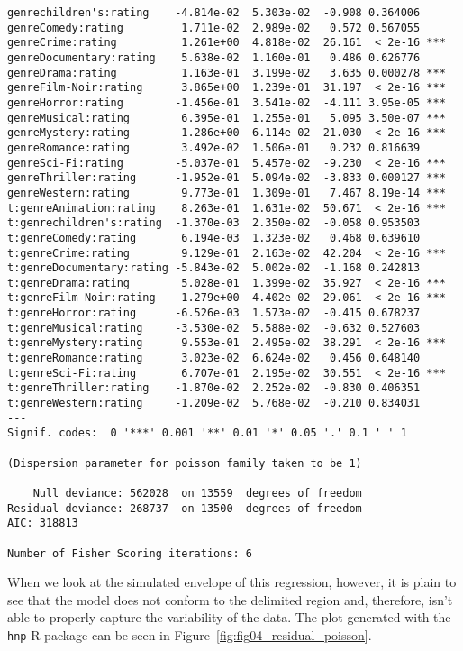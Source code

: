 \begin{verbatim}
genrechildren's:rating    -4.814e-02  5.303e-02  -0.908 0.364006
genreComedy:rating         1.711e-02  2.989e-02   0.572 0.567055
genreCrime:rating          1.261e+00  4.818e-02  26.161  < 2e-16 ***
genreDocumentary:rating    5.638e-02  1.160e-01   0.486 0.626776
genreDrama:rating          1.163e-01  3.199e-02   3.635 0.000278 ***
genreFilm-Noir:rating      3.865e+00  1.239e-01  31.197  < 2e-16 ***
genreHorror:rating        -1.456e-01  3.541e-02  -4.111 3.95e-05 ***
genreMusical:rating        6.395e-01  1.255e-01   5.095 3.50e-07 ***
genreMystery:rating        1.286e+00  6.114e-02  21.030  < 2e-16 ***
genreRomance:rating        3.492e-02  1.506e-01   0.232 0.816639
genreSci-Fi:rating        -5.037e-01  5.457e-02  -9.230  < 2e-16 ***
genreThriller:rating      -1.952e-01  5.094e-02  -3.833 0.000127 ***
genreWestern:rating        9.773e-01  1.309e-01   7.467 8.19e-14 ***
t:genreAnimation:rating    8.263e-01  1.631e-02  50.671  < 2e-16 ***
t:genrechildren's:rating  -1.370e-03  2.350e-02  -0.058 0.953503
t:genreComedy:rating       6.194e-03  1.323e-02   0.468 0.639610
t:genreCrime:rating        9.129e-01  2.163e-02  42.204  < 2e-16 ***
t:genreDocumentary:rating -5.843e-02  5.002e-02  -1.168 0.242813
t:genreDrama:rating        5.028e-01  1.399e-02  35.927  < 2e-16 ***
t:genreFilm-Noir:rating    1.279e+00  4.402e-02  29.061  < 2e-16 ***
t:genreHorror:rating      -6.526e-03  1.573e-02  -0.415 0.678237
t:genreMusical:rating     -3.530e-02  5.588e-02  -0.632 0.527603
t:genreMystery:rating      9.553e-01  2.495e-02  38.291  < 2e-16 ***
t:genreRomance:rating      3.023e-02  6.624e-02   0.456 0.648140
t:genreSci-Fi:rating       6.707e-01  2.195e-02  30.551  < 2e-16 ***
t:genreThriller:rating    -1.870e-02  2.252e-02  -0.830 0.406351
t:genreWestern:rating     -1.209e-02  5.768e-02  -0.210 0.834031
---
Signif. codes:  0 '***' 0.001 '**' 0.01 '*' 0.05 '.' 0.1 ' ' 1

(Dispersion parameter for poisson family taken to be 1)

    Null deviance: 562028  on 13559  degrees of freedom
Residual deviance: 268737  on 13500  degrees of freedom
AIC: 318813

Number of Fisher Scoring iterations: 6
\end{verbatim}

When we look at the simulated envelope of this regression, however, it is plain
to see that the model does not conform to the delimited region and, therefore,
isn't able to properly capture the variability of the data. The plot generated
with the \verb|hnp| \citep{moral_half-normal_2017} R package can be seen in
Figure~\ref{fig:fig04_residual_poisson}.

